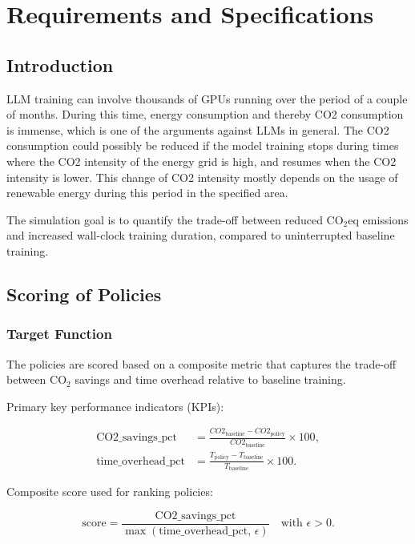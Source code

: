 
\chapter{Requirements and Specifications}
\label{sec:requirements}

\section{Introduction}

LLM training can involve thousands of GPUs running over the period of a couple of months. During this time, energy consumption and thereby CO2 consumption is immense, which is one of the arguments against LLMs in general. The CO2 consumption could possibly be reduced if the model training stops during times where the CO2 intensity of the energy grid is high, and resumes when the CO2 intensity is lower. This change of CO2 intensity mostly depends on the usage of renewable energy during this period in the specified area.

The simulation goal is to quantify the trade-off between reduced CO$_2$eq emissions and increased wall-clock training duration, compared to uninterrupted baseline training.

\section{Scoring of Policies}

\subsection{Target Function}

The policies are scored based on a composite metric that captures the trade-off between CO$_2$ savings and time overhead relative to baseline training.

Primary key performance indicators (KPIs):

\begin{align*}
  \text{CO2\_savings\_pct} &= \frac{CO2_{\text{baseline}} - CO2_{\text{policy}}}{CO2_{\text{baseline}}} \times 100, \\
  \text{time\_overhead\_pct} &= \frac{T_{\text{policy}} - T_{\text{baseline}}}{T_{\text{baseline}}} \times 100.
\end{align*}

Composite score used for ranking policies:

\[
  \text{score} = \frac{\text{CO2\_savings\_pct}}{\max(\text{time\_overhead\_pct}, \, \epsilon)} \quad \text{with } \epsilon > 0.
\]

